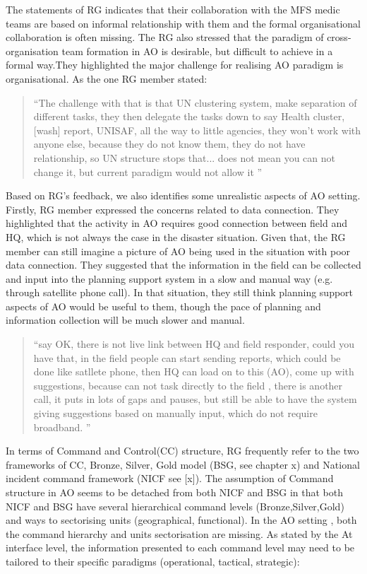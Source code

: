 The statements of RG indicates that their collaboration with the MFS medic teams are based on informal  relationship with them and the formal organisational collaboration is often missing. The RG also stressed that the paradigm of cross-organisation team formation in AO is desirable, but difficult to achieve in a formal way.They highlighted the major challenge for realising AO paradigm is organisational. As the one RG member stated:\\

\begin{quotation}
``The challenge with that is that UN clustering system, make separation of different tasks, they then delegate the tasks down to say Health cluster, [wash] report, UNISAF, all the way to little agencies, they won't work with anyone else, because they do not know them, they do not have relationship, so UN structure stops that... does not mean you can not change it, but current paradigm would not allow it ''
\end{quotation}

Based on RG's feedback, we also identifies some unrealistic aspects of AO setting. Firstly, RG member expressed the concerns related to data connection. They highlighted that the activity in AO requires good connection between field and HQ, which is not always the case in the disaster situation. Given that, the RG member can still imagine a picture of AO being used in the situation with poor data connection. They suggested that the information in the field can be collected and input into the planning support system in a slow and manual way (e.g. through satellite phone call). In that situation, they still think planning support aspects of AO would be useful to them, though the pace of planning and information collection will be much slower and manual. \\

\begin{quotation}
``say  OK, there is not live link between HQ and field responder, could you have that, in the field people can start sending reports, which could be done like satllete phone, then HQ can load on to this (AO), come up with suggestions, because can not task directly to the field , there is another call,  it puts in lots of gaps and pauses, but still be able to have the system giving suggestions based on manually input, which do not require broadband. ''
\end{quotation}


In terms of Command and Control(CC) structure, RG frequently refer to the two frameworks of CC,  Bronze, Silver, Gold model (BSG, see chapter x) and National incident command framework (NICF see [x]). The assumption of Command structure in AO seems to be detached from both NICF and BSG in that both NICF and BSG have several hierarchical command levels (Bronze,Silver,Gold) and ways to sectorising units (geographical, functional).  In the AO setting , both the command hierarchy and units sectorisation are missing. As stated by the At interface level, the information presented to each command level may need to be tailored to their specific paradigms (operational, tactical, strategic):

